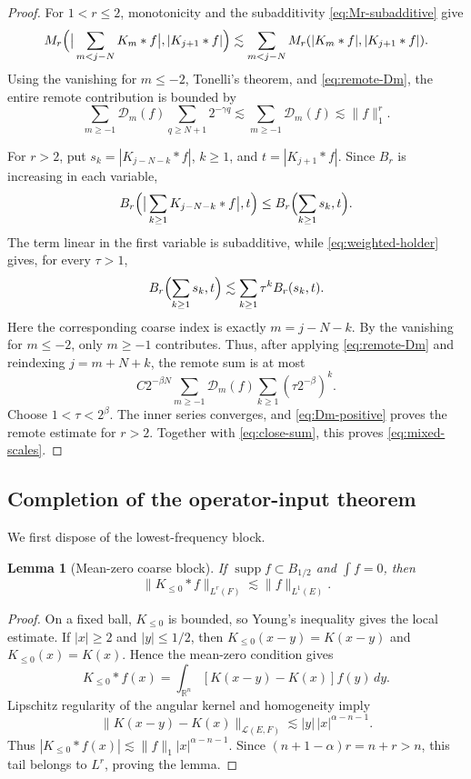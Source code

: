 \documentclass[10pt,a4paper]{amsart}
\numberwithin{equation}{section}
\newtheorem{lemma}[theorem]{Lemma}
\newcommand{\R}{\mathbb R}
\newcommand{\cL}{\mathcal L}
\newcommand{\supp}{\operatorname{supp}}
\newcommand{\norm}[1]{\lVert #1\rVert}
\begin{document}
\begin{proof}
For $1<r\le2$, monotonicity and the subadditivity
\eqref{eq:Mr-subadditive} give
\[
 M_r\Bigl(\big|\sum_{m<j-N}K_m*f\big|,|K_{j+1}*f|\Bigr)
 \lesssim\sum_{m<j-N}M_r(|K_m*f|,|K_{j+1}*f|).
\]
Using the vanishing for $m\le-2$, Tonelli's theorem, and
\eqref{eq:remote-Dm}, the entire remote contribution is bounded by
\[
 \sum_{m\ge-1}\mathcal D_m(f)
 \sum_{q\ge N+1}2^{-\gamma q}
 \lesssim \sum_{m\ge-1}\mathcal D_m(f)
 \lesssim\norm f_1^r.
\]

For $r>2$, put
$s_k=|K_{j-N-k}*f|$, $k\ge1$, and $t=|K_{j+1}*f|$.  Since $B_r$ is increasing
in each variable,
\[
 B_r\Bigl(\big|\sum_{k\ge1}K_{j-N-k}*f\big|,t\Bigr)
 \le B_r\Bigl(\sum_{k\ge1}s_k,t\Bigr).
\]
The term linear in the first variable is subadditive, while
\eqref{eq:weighted-holder} gives, for every $\tau>1$,
\begin{equation}\label{eq:weighted-Br}
 B_r\Bigl(\sum_{k\ge1}s_k,t\Bigr)
 \lesssim\sum_{k\ge1}\tau^k B_r(s_k,t).
\end{equation}
Here the corresponding coarse index is exactly
$m=j-N-k$.  By the vanishing for $m\le-2$, only $m\ge-1$ contributes.  Thus,
after applying \eqref{eq:remote-Dm} and reindexing $j=m+N+k$, the remote sum
is at most
\[
 C2^{-\beta N}
 \sum_{m\ge-1}\mathcal D_m(f)
 \sum_{k\ge1}(\tau2^{-\beta})^k.
\]
Choose $1<\tau<2^\beta$.  The inner series converges, and
\eqref{eq:Dm-positive} proves the remote estimate for $r>2$.
Together with \eqref{eq:close-sum}, this proves \eqref{eq:mixed-scales}.
\end{proof}


\subsection{Completion of the operator-input theorem}
We first dispose of the lowest-frequency block.

\begin{lemma}[Mean-zero coarse block]\label{lem:coarse-block}
If $\supp f\subset B_{1/2}$ and $\int f=0$, then
\begin{equation}\label{eq:coarse-block}
 \norm{K_{\le0}*f}_{L^r(F)}\lesssim\norm f_{L^1(E)}.
\end{equation}
\end{lemma}

\begin{proof}
On a fixed ball, $K_{\le0}$ is bounded, so Young's inequality gives the local
estimate.  If $|x|\ge2$ and $|y|\le1/2$, then
$K_{\le0}(x-y)=K(x-y)$ and $K_{\le0}(x)=K(x)$.  Hence the mean-zero condition
gives
\[
 K_{\le0}*f(x)
 =\int_{\R^n}[K(x-y)-K(x)]f(y)\,dy.
\]
Lipschitz regularity of the angular kernel and homogeneity imply
\[
 \norm{K(x-y)-K(x)}_{\cL(E,F)}
 \lesssim |y|\,|x|^{\alpha-n-1}.
\]
Thus
$|K_{\le0}*f(x)|\lesssim\norm f_1|x|^{\alpha-n-1}$.  Since
$(n+1-\alpha)r=n+r>n$, this tail belongs to $L^r$, proving the lemma.
\end{proof}
\end{document}
